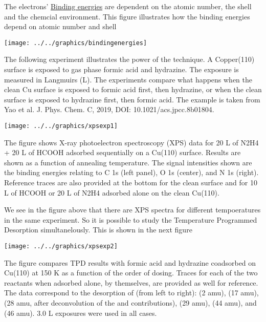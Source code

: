 \documentclass[ignorenonframetext]{beamer}
\begin{document}
The electrons' \underline{Binding energies} are dependent on the atomic number, the shell and the chemcial environment. This figure illustrates how the binding energies depend on atomic number and shell

\begin{center}\texttt{[image: ../../graphics/bindingenergies]}\end{center}

The following experiment illustrates the power of the technique. A Copper(110) surface is exposed to gas phase formic acid and hydrazine. The exposure is measured in Langmuirs (L). The experiments compare what happens when the clean Cu surface is exposed to formic acid first, then hydrazine, or when the clean surface is exposed to hydrazine first, then formic acid. The example is taken from Yao et al. J. Phys. Chem. C, 2019, DOI: 10.1021/acs.jpcc.8b01804.

\begin{center}\texttt{[image: ../../graphics/xpsexp1]}\end{center}

The figure shows  X-ray photoelectron spectroscopy (XPS) data for 20 L of N2H4 + 20 L of HCOOH adsorbed sequentially on a Cu(110) surface. Results are shown as a function of annealing  temperature.  The signal intensities shown are the binding energies relating to C 1s (left panel), O 1s (center), and N 1s (right). Reference traces are also provided at the bottom for the clean surface and for 10 L of HCOOH or 20 L of N2H4 adsorbed alone on the clean Cu(110).


We see in the figure above that there are XPS spectra for different tempoeratures in the same experiment. So it is possible to study the Temperature Programmed Desorption simultanelously. This is shown in the next figure

\begin{center}\texttt{[image: ../../graphics/xpsexp2]}\end{center}

The figure compares TPD results with formic acid and hydrazine coadsorbed on Cu(110) at 150 K as a function of the order of dosing. Traces for each of the two reactants when adsorbed alone, by themselves, are provided as well for reference. The data correspond to the desorption of (from left to right):  (2 amu),  (17 amu),  (28 amu, after deconvolution of the  and  contributions),  (29 amu),  (44 amu), and  (46 amu). 3.0 L exposures were used in all cases.
\end{document}
